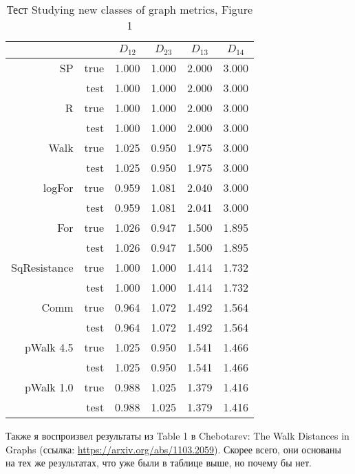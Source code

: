 \documentclass{article}
\begin{document}
\begin{table}[H]
\centering
\caption{Тест Studying new classes of graph metrics, Figure 1}
\label{}
\begin{tabular}{rr|cccc}
             &      & $D_{12}$ & $D_{23}$ & $D_{13}$ & $D_{14}$ \\
             \hline
SP           & true & 1.000 & 1.000 & 2.000 & 3.000 \\
             & test & 1.000 & 1.000 & 2.000 & 3.000 \\
             \hline
R            & true & 1.000 & 1.000 & 2.000 & 3.000 \\
             & test & 1.000 & 1.000 & 2.000 & 3.000 \\
             \hline
Walk         & true & 1.025 & 0.950 & 1.975 & 3.000 \\
             & test & 1.025 & 0.950 & 1.975 & 3.000 \\
             \hline
logFor       & true & 0.959 & 1.081 & 2.040 & 3.000 \\
             & test & 0.959 & 1.081 & 2.041 & 3.000 \\
             \hline
For          & true & 1.026 & 0.947 & 1.500 & 1.895 \\
             & test & 1.026 & 0.947 & 1.500 & 1.895 \\
             \hline
SqResistance & true & 1.000 & 1.000 & 1.414 & 1.732 \\
             & test & 1.000 & 1.000 & 1.414 & 1.732 \\
             \hline
Comm         & true & 0.964 & 1.072 & 1.492 & 1.564 \\
             & test & 0.964 & 1.072 & 1.492 & 1.564 \\
             \hline
pWalk 4.5    & true & 1.025 & 0.950 & 1.541 & 1.466 \\
             & test & 1.025 & 0.950 & 1.541 & 1.466 \\
             \hline
pWalk 1.0    & true & 0.988 & 1.025 & 1.379 & 1.416 \\
             & test & 0.988 & 1.025 & 1.379 & 1.416
\end{tabular}
\end{table}

Также я воспроизвел результаты из Table 1 в Chebotarev: The Walk Distances in Graphs (ссылка: \url{https://arxiv.org/abs/1103.2059}). Скорее всего, они основаны на тех же результатах, что уже были в таблице выше, но почему бы нет.
\end{document}
